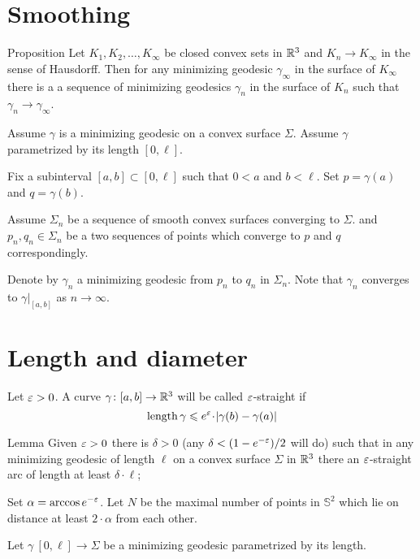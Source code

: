 \documentclass[a4paper,10pt]{amsart}
\begin{document}
\section{Smoothing}

\begin{thm}{Proposition}\label{prop:smooth}
Let $K_1,K_2,\dots,K_\infty$ be closed convex sets in $\mathbb{R}^3$
and $K_n\to K_\infty$ in the sense of Hausdorff.
Then for any minimizing geodesic $\gamma_\infty$ in the surface of $K_\infty$
there is a a sequence of minimizing geodesics $\gamma_n$ in the surface of $K_n$ such that  $\gamma_n\to\gamma_\infty$.
\end{thm}

Assume $\gamma$ is a minimizing geodesic on a convex surface $\Sigma$.
Assume $\gamma$ parametrized by its length $[0,\ell]$.

Fix a subinterval $[a,b]\subset [0,\ell]$
such that $0<a$ and $b<\ell$.
Set $p=\gamma(a)$ and $q=\gamma(b)$.

Assume $\Sigma_n$ be a sequence of smooth convex surfaces converging to $\Sigma$.
and $p_n,q_n\in\Sigma_n$ be a two sequences of points which converge to $p$ and $q$ 
correspondingly.

Denote by $\gamma_n$ a minimizing geodesic from $p_n$ to $q_n$ in $\Sigma_n$.
Note that $\gamma_n$ converges to $\gamma|_{[a,b]}$
as $n\to\infty$.
\qeds

\section{Length and diameter}

Let $\varepsilon>0$.
A curve $\gamma\colon[a,b]\to\mathbb{R}^3$ will be called $\varepsilon$-straight
if 
\[\length \gamma\le e^\eps\cdot|\gamma(b)-\gamma(a)|\]

\begin{thm}{Lemma}\label{lem:eps-straight}
Given $\varepsilon>0$ there is $\delta>0$ (any  $\delta<(1-e^{-\varepsilon})/2$ will do)
such that
in any minimizing geodesic of length $\ell$
on a convex surface $\Sigma$ in $\mathbb{R}^3$ there an $\varepsilon$-straight arc of length at least $\delta\cdot\ell$;
\end{thm}

Set $\alpha=\arccos e^{-\varepsilon}$.
Let $N$ be the maximal number of points in $\mathbb S^2$ which lie on distance at least $2\cdot\alpha$ from each other.

Let $\gamma\:[0,\ell]\to \Sigma$ be a minimizing geodesic parametrized by its length.
\end{document}
